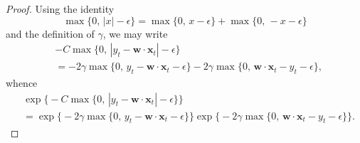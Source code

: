 \begin{proof}
Using the identity
\begin{equation}
	\max\big\{0,\, |x| - \epsilon\big\}
	= \max\big\{0,\, x - \epsilon\big\} + \max\big\{0,\, -x - \epsilon\big\}
\end{equation}
and the definition of $\gamma$, we may write
\begin{align}
	& -C\max\big\{0,\, |y_t - \mathbf{w}\cdot\mathbf{x}_t| - \epsilon\big\}
	\nonumber \\
	&= -2\gamma\max\big\{0,\, y_t - \mathbf{w}\cdot\mathbf{x}_t - \epsilon\big\} - 2\gamma\max\big\{0,\, \mathbf{w}\cdot\mathbf{x}_t - y_t - \epsilon\big\},
\end{align}
whence
\begin{align}
\label{eq:ilf-mixture-rep-proof-eq1}
	& \exp\Big\{-C\max\big\{0,\, |y_t - \mathbf{w}\cdot\mathbf{x}_t| - \epsilon\big\}\Big\}
	\nonumber \\
	&= \exp\Big\{-2\gamma\max\big\{0,\, y_t - \mathbf{w}\cdot\mathbf{x}_t - \epsilon\big\}\Big\}
	\exp\Big\{-2\gamma\max\big\{0,\, \mathbf{w}\cdot\mathbf{x}_t - y_t - \epsilon\big\}\Big\}.
\end{align}


\end{proof}
